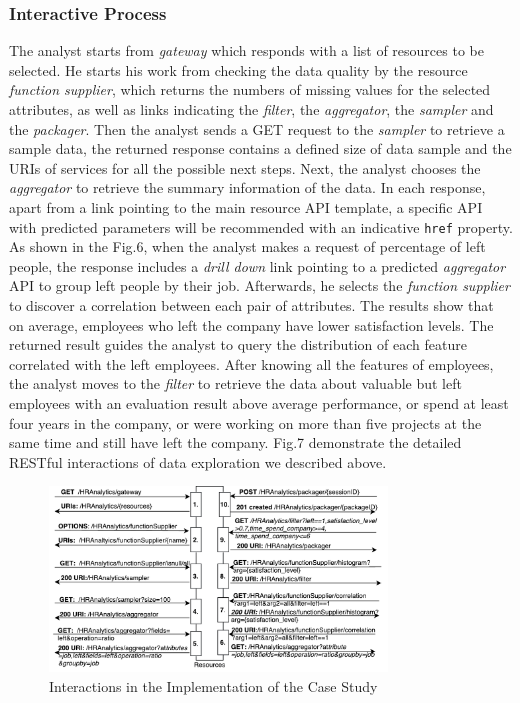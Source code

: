 \documentclass[10pt, conference, compsocconf]{IEEEtran}
\begin{document}
\subsubsection{Interactive Process}
The analyst starts from \textit{gateway} which responds with a list of resources to be selected. He starts his work from checking the data quality by the resource \textit{function supplier}, which returns the numbers of missing values for the selected attributes,  as well as links indicating the \textit{filter}, the \textit{aggregator}, the \textit{sampler} and the \textit{packager}. Then the analyst sends a GET request to the \textit{sampler} to retrieve a sample data, the returned response contains a defined size of data sample and the URIs of services for all the possible next steps. Next, the analyst chooses the \textit{aggregator} to retrieve the summary information of the data. In each response, apart from a link pointing to the main resource API template, a specific API with predicted parameters will be recommended with an indicative \texttt{href} property. As shown in the Fig.6, when the analyst makes a request of percentage of left people, the response includes a \textit{drill down} link pointing to a predicted \textit{aggregator} API to group left people by their job. Afterwards, he selects the \textit{function supplier} to discover a correlation between each pair of attributes. The results show that on average, employees who left the company have lower satisfaction levels. The returned result guides the analyst to query the distribution of each feature correlated with the left employees. After knowing all the features of employees, the analyst moves to the \textit{filter} to retrieve the data about valuable but left employees with an evaluation result above average performance, or spend at least four years in the company, or were working on more than five projects at the same time and still have left the company. Fig.7 demonstrate the detailed RESTful interactions of data exploration we described above.
\begin{figure}[h]
	\centering
	\includegraphics[width=0.8\textwidth]{CaseStudyInteractive}
	\caption{Interactions in the Implementation of the Case Study}
	\label{fig.7}
\end{figure}
\end{document}
